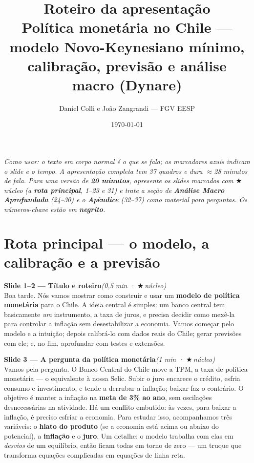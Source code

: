\documentclass[11pt,a4paper]{article}
\title{\textbf{Roteiro da apresentação}\\[2mm]
\large Política monetária no Chile --- modelo Novo-Keynesiano mínimo,\\calibração, previsão e análise macro (Dynare)}
\author{Daniel Colli e João Zangrandi --- FGV EESP}
\date{\today}
\newcommand{\slide}[3]{\medskip\noindent{\color{azul}\rule{3pt}{14pt}}\;
  \textbf{Slide #1 --- #2}\hfill\textit{(#3)}\\[1mm]}
\newcommand{\nucleo}{{\color{verdee}\footnotesize$\bigstar$\,núcleo}}
\begin{document}
\maketitle

\noindent\textit{Como usar: o texto em corpo normal é o que se fala; os marcadores azuis indicam o
slide e o tempo. A apresentação completa tem 37 quadros e dura $\approx$28 minutos de fala. Para uma
versão de \textbf{20 minutos}, apresente os slides marcados com \nucleo{} (a \textbf{rota principal},
1--23 e 31) e trate a seção de \textbf{Análise Macro Aprofundada} (24--30) e o \textbf{Apêndice}
(32--37) como material para perguntas. Os números-chave estão em \textbf{negrito}.}

\bigskip

\section{Rota principal --- o modelo, a calibração e a previsão}

\slide{1--2}{Título e roteiro}{0,5 min · \nucleo}
Boa tarde. Nós vamos mostrar como construir e usar um \textbf{modelo de política monetária} para o
Chile. A ideia central é simples: um banco central tem basicamente \emph{um} instrumento, a taxa de
juros, e precisa decidir como mexê-la para controlar a inflação sem desestabilizar a economia. Vamos
começar pelo modelo e a intuição; depois calibrá-lo com dados reais do Chile; gerar previsões com ele;
e, no fim, aprofundar com testes e extensões.

\slide{3}{A pergunta da política monetária}{1 min · \nucleo}
Vamos pela pergunta. O Banco Central do Chile move a TPM, a taxa de política monetária --- o
equivalente à nossa Selic. Subir o juro encarece o crédito, esfria consumo e investimento, e tende a
derrubar a inflação; baixar faz o contrário. O objetivo é manter a inflação na \textbf{meta de 3\% ao
ano}, sem oscilações desnecessárias na atividade. Há um conflito embutido: às vezes, para baixar a
inflação, é preciso esfriar a economia. Para estudar isso, acompanhamos três variáveis: o
\textbf{hiato do produto} (se a economia está acima ou abaixo do potencial), a \textbf{inflação} e o
\textbf{juro}. Um detalhe: o modelo trabalha com elas em \emph{desvios} de um equilíbrio, então ficam
todas em torno de zero --- um truque que transforma equações complicadas em equações de linha reta.
\end{document}
